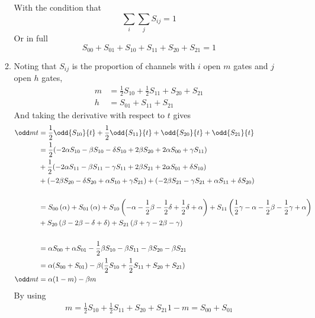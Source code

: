 \documentclass{X:/Documents/Coding/Latex/myassignment}
\begin{document}
\begin{enumerate}
\begin{enumerate}
		With the condition that 
		\[\sum_{i} \sum_{j} S_{ij} = 1\]
		Or in full
		\[S_{00} + S_{01} + S_{10} + S_{11} + S_{20} + S_{21} = 1\]


		\item
		Noting that $S_{ij}$ is the proportion of channels with $i$ open $m$ gates and $j$ open $h$ gates,
		\begin{align*}
			m &= \frac12 S_{10} + \frac12 S_{11} + S_{20} + S_{21}\\
			h &= S_{01} + S_{11} + S_{21}
		\end{align*}
		And taking the derivative with respect to $t$ gives
		\begin{align*}
			\odd m t &= \frac12\odd{S_{10}}{t} + \frac12\odd{S_{11}}{t} + \odd{S_{20}}{t} + \odd{S_{21}}{t}\\
			&= \frac12(- 2\alpha S_{10} -\beta S_{10} - \delta S_{10} + 2 \beta S_{20} + 2\alpha S_{00} +  \gamma S_{11})\\
			&+ \frac12(-2\alpha S_{11} -\beta S_{11} - \gamma S_{11} + 2 \beta S_{21} + 2\alpha S_{01} +  \delta S_{10}) \\
			&+ \left(- 2\beta S_{20} - \delta S_{20} + \alpha S_{10} + \gamma S_{21} \right) +  \left( - 2\beta S_{21} - \gamma S_{21} + \alpha S_{11} + \delta S_{20}\right)\\\\
			&= S_{00} \left(\alpha\right) + S_{01} \left(\alpha\right) + S_{10} \left(- \alpha - \frac12\beta - \frac12\delta + \frac12\delta + \alpha\right) + S_{11}\left(\frac12\gamma - \alpha - \frac12\beta - \frac12\gamma + \alpha\right) \\
			&+ S_{20} \left(\beta - 2 \beta - \delta +  \delta\right) + S_{21} \left(\beta +  \gamma - 2 \beta - \gamma\right)\\\\
			&= \alpha S_{00} + \alpha S_{01} - \frac12 \beta S_{10} - \beta S_{11} - \beta S_{20} - \beta S_{21}\\
			&= \alpha(S_{00} + S_{01}) - \beta (\frac12S_{10} + \frac12 S_{11} + S_{20} + S_{21})\\
			\odd mt &= \alpha(1-m) - \beta m
		\end{align*}
		By using 
		\begin{align*}
			m = \frac12 S_{10} + \frac12 S_{11} + S_{20} + S_{21}
			1 - m = S_{00} + S_{01}\\
		\end{align*}


\end{enumerate}
\end{enumerate}
\end{document}

